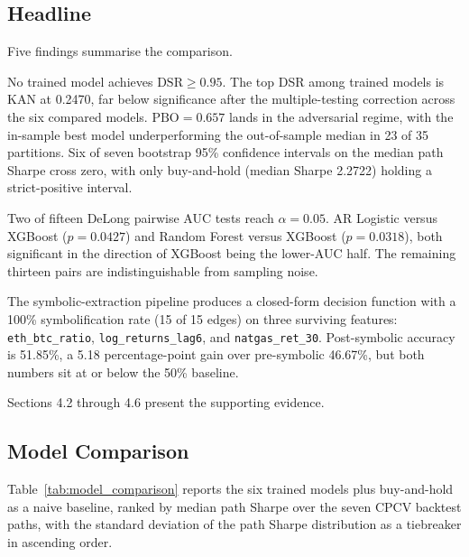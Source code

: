 \documentclass[12pt,a4paper,oneside]{article}
\begin{document}
\subsection{Headline}\label{subsec:results_headline}

Five findings summarise the comparison.

No trained model achieves $\text{DSR} \geq 0.95$. The top DSR among trained models is KAN at 0.2470, far below significance after the multiple-testing correction across the six compared models. $\text{PBO} = 0.657$ lands in the adversarial regime, with the in-sample best model underperforming the out-of-sample median in 23 of 35 partitions. Six of seven bootstrap 95\% confidence intervals on the median path Sharpe cross zero, with only buy-and-hold (median Sharpe 2.2722) holding a strict-positive interval.

Two of fifteen DeLong pairwise AUC tests reach $\alpha = 0.05$. AR Logistic versus XGBoost ($p = 0.0427$) and Random Forest versus XGBoost ($p = 0.0318$), both significant in the direction of XGBoost being the lower-AUC half. The remaining thirteen pairs are indistinguishable from sampling noise.

The symbolic-extraction pipeline produces a closed-form decision function with a 100\% symbolification rate (15 of 15 edges) on three surviving features: \texttt{eth\_btc\_ratio}, \texttt{log\_returns\_lag6}, and \texttt{natgas\_ret\_30}. Post-symbolic accuracy is 51.85\%, a 5.18 percentage-point gain over pre-symbolic 46.67\%, but both numbers sit at or below the 50\% baseline.

Sections 4.2 through 4.6 present the supporting evidence.


\subsection{Model Comparison}\label{subsec:results_comparison}

Table~\ref{tab:model_comparison} reports the six trained models plus buy-and-hold as a naive baseline, ranked by median path Sharpe over the seven CPCV backtest paths, with the standard deviation of the path Sharpe distribution as a tiebreaker in ascending order.
\end{document}
